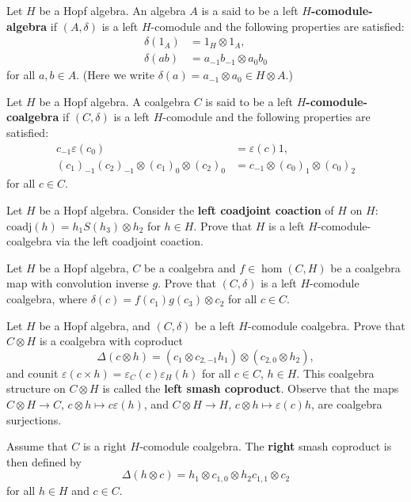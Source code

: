 \begin{definition}
Let $H$ be a Hopf algebra. An algebra $A$ is a said to be a left
\textbf{$H$-comodule-algebra} if $(A,\delta)$ is a left $H$-comodule and the
following properties are satisfied:
\begin{align*}
\delta(1_{A}) & =1_{H}\otimes1_{A},\\
\delta(ab) & =a_{-1}b_{-1}\otimes a_{0}b_{0}
\end{align*}
for all $a,b\in A$. (Here we write $\delta(a)=a_{-1}\otimes a_{0}\in H\otimes A$.)
\end{definition}


\begin{definition}
Let $H$ be a Hopf algebra. A coalgebra $C$ is said to be a left
\textbf{$H$-comodule-coalgebra} if $(C,\delta)$ is a left $H$-comodule and
the following properties are satisfied:
\begin{align*}
c_{-1}\varepsilon(c_{0}) & =\varepsilon(c)1,\\
(c_{1})_{-1}(c_{2})_{-1}\otimes(c_{1})_{0}\otimes(c_{2})_{0} & =c_{-1}\otimes(c_{0})_{1}\otimes(c_{0})_{2}
\end{align*}
for all $c\in C$.
\end{definition}

\begin{exercise}
Let $H$ be a Hopf algebra. Consider the \textbf{left coadjoint coaction}
of $H$ on $H$: $\mathrm{coadj}(h)=h_{1}S(h_{3})\otimes h_{2}$ for $h\in H$. Prove that 
$H$ is a left $H$-comodule-coalgebra via the left coadjoint coaction.
\end{exercise}

\begin{exercise}
Let $H$ be a Hopf algebra, $C$ be a coalgebra and $f\in\hom(C,H)$
be a coalgebra map with convolution inverse $g$. Prove that $(C,\delta)$
is a left $H$-comodule coalgebra, where $\delta(c)=f(c_{1})g(c_{3})\otimes c_{2}$
for all $c\in C$. 
\end{exercise}

\begin{exercise}
\label{exercise:smash_coleft}
Let $H$ be a Hopf algebra, and $(C,\delta)$ be a left $H$-comodule
coalgebra. Prove that $C\otimes H$ is a coalgebra with coproduct
\[
\Delta(c\otimes h)=\left(c_{1}\otimes c_{2,-1}h_{1}\right)\otimes\left(c_{2,0}\otimes h_{2}\right),
\]
and counit $\varepsilon(c\times h)=\varepsilon_{C}(c)\varepsilon_{H}(h)$ for
all $c\in C$, $h\in H$. This coalgebra structure on $C\otimes H$ is called the
\textbf{left smash coproduct}. Observe that the maps $C\otimes H\to C$,
$c\otimes h\mapsto c\varepsilon(h)$, and $C\otimes H\to H$, $c\otimes h\mapsto
\varepsilon(c)h$, are coalgebra surjections.
\end{exercise}

Assume that $C$ is a right $H$-comodule coalgebra. The \textbf{right}
smash coproduct is then defined by 
\[
\Delta(h\otimes c)=h_{1}\otimes c_{1,0}\otimes h_{2}c_{1,1}\otimes c_{2}
\]
for all $h\in H$ and $c\in C$.

